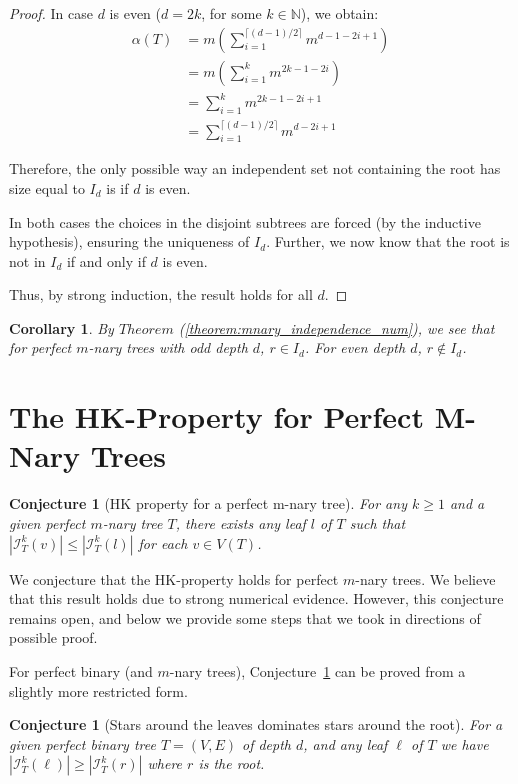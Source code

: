 \documentclass[10pt]{amsart}
\newtheorem{conjecture}[theorem]{Conjecture}
\newtheorem{corollary}[theorem]{Corollary}
\theoremstyle{definition}
\begin{document}
\begin{proof}
	In case $d$ is even ($d = 2k$, for some $k \in \mathbb{N}$), we obtain:
	\begin{align*}
		\alpha(T) & = m\left(\sum_{i=1}^{\lceil (d-1)/2 \rceil} m^{d - 1 -2i+1}\right) \\
		          & = m\left(\sum_{i=1}^{k} m^{2k - 1 - 2i}\right)                     \\
		          & = \sum_{i=1}^{k} m^{2k - 1 - 2i + 1}                               \\
		          & = \sum_{i = 1}^{\lceil (d - 1)/ 2\rceil}m^{d-2i+1}
	\end{align*}

	Therefore, the only possible way an independent set not containing the root has size equal to $I_d$ is if $d$ is even.

	\medskip

	In both cases the choices in the disjoint subtrees are forced (by the inductive hypothesis), ensuring the uniqueness of $I_{d}$. Further, we now know that the root is not in $I_{d}$ if and only if $d$ is even.

	Thus, by strong induction, the result holds for all $d$.
\end{proof}

\begin{corollary}\label{cor:root_in_not_in}
	By $Theorem$ (\ref{theorem:mnary_independence_num}), we see that for perfect $m$-nary trees with odd depth $d$, $r \in I_d$. For even depth $d$, $r \not\in I_d$.
\end{corollary}

\section{The HK-Property for Perfect M-Nary Trees}

\begin{conjecture}[HK property for a perfect m-nary tree]\label{conj:mnary_hk}
	For any $k \geq 1$ and a given perfect $m$-nary tree $T$, there exists any leaf $l$ of $T$ such that $|\mathcal{I}^k_T(v)| \leq |\mathcal{I}^k_T(l)|$ for each $v \in V(T)$.
\end{conjecture}

We conjecture that the HK-property holds for perfect $m$-nary trees. We believe that this result holds due to strong numerical evidence. However, this conjecture remains open, and below we provide some steps that we took in directions of possible proof.

For perfect binary (and $m$-nary trees), Conjecture~\ref{conj:mnary_hk} can be proved from a slightly more restricted form.
\begin{conjecture}[Stars around the leaves dominates stars around the root]\label{conj:leaves_dom_root}
	For a given perfect binary tree $T = (V, E)$	of depth $d$, and any leaf $\ell$ of $T$ we have $|\mathcal{I}^k_T(\ell)| \geq  |\mathcal{I}^k_T(r)|$ where $r$ is the root.
\end{conjecture}
\end{document}
